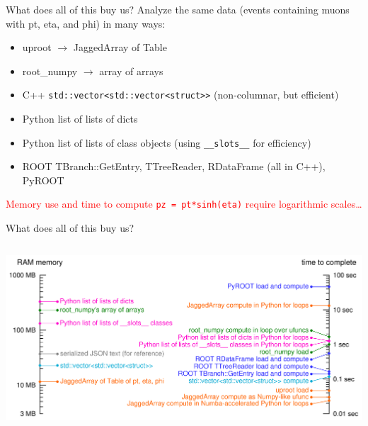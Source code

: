 \documentclass[aspectratio=169]{beamer}
\begin{document}
\begin{frame}{What does all of this buy us?}
\vspace{0.5 cm}
Analyze the same data (events containing muons with pt, eta, and phi) in many ways:
\begin{itemize}
\item uproot $\to$ JaggedArray of Table
\item root\_numpy $\to$ array of arrays
\item C++ {\tt\small std::vector<std::vector<struct>>} (non-columnar, but efficient)
\item Python list of lists of dicts
\item Python list of lists of class objects (using {\tt\small \_\_slots\_\_} for efficiency)
\item ROOT TBranch::GetEntry, TTreeReader, RDataFrame (all in C++), PyROOT
\end{itemize}

\vspace{0.5 cm}
\textcolor{red}{Memory use and time to compute {\tt\small pz = pt*sinh(eta)} require logarithmic scales\ldots}
\end{frame}

\begin{frame}{What does all of this buy us?}
\vspace{0.3 cm}
\begin{columns}
\includegraphics[width=\linewidth]{logscales.pdf}
\end{columns}
\end{frame}
\end{document}
